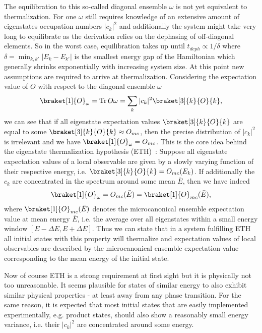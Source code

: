 The equilibration to this so-called diagonal ensemble $\omega$ is not yet equivalent to thermalization. For one $\omega$ still requires knowledge of an extensive amount of eigenstates occupation numbers  $|c_k|^2$ and additionally the system might take very long to equilibrate as the derivation relies on the dephasing of off-diagonal elements. So in the worst case, equilibration takes up until $t_{deph} \propto 1/\delta$ where $\delta=\min_{k,k'}|E_k-E_{k'}|$ is the smallest energy gap of the Hamiltonian which generally shrinks exponentially with increasing system size. At this point new assumptions are required to arrive at thermalization. Considering the expectation value of $O$ with respect to the diagonal ensemble $\omega$
\begin{equation}
	\braket[1]{O}_{\omega} = \Tr O \omega = \sum_k |c_k|^2 \braket[3]{k}{O}{k},
\end{equation}
we can see that if all eigenstate expectation values $\braket[3]{k}{O}{k}$ are equal to some $\braket[3]{k}{O}{k}\approx O_{mc}$, then the precise distribution of $|c_k|^2$ is irrelevant and we have $\braket[1]{O}_{\omega} = O_{mc}$. 
This is the core idea behind the eigenstate thermalization hypothesis (ETH)~\cite{deutschQuantumStatisticalMechanics1991,srednickiChaosQuantumThermalization1994,rigolThermalizationItsMechanism2008}: Suppose all eigenstate expectation values of a local observable are given by a slowly varying function of their respective energy, i.e. $\braket[3]{k}{O}{k}=O_{mc}(E_k)$. 
If additionally the $c_k$ are concentrated in the spectrum around some mean $\bar{E}$, then we have indeed
\begin{align}
	\braket[1]{O}_{\omega} = O_{mc}(\bar{E}) = \braket[1]{O}_{mc}(\bar{E}),
\end{align}
where $\braket[1]{O}_{mc}(\bar{E})$ denotes the microcanonical ensemble expectation value at mean energy $\bar{E}$, i.e. the average over all eigenstates within a small energy window $[E-\Delta E, E+\Delta E]$. Thus we can state that in a system fulfilling ETH all initial states with this property will thermalize and expectation values of local observables are described by the microcanonical ensemble expectation value corresponding to the mean energy of the initial state.

Now of course ETH is a strong requirement at first sight but it is physically not too unreasonable. It seems plausible for states of similar energy to also exhibit similar physical properties - at least away from any phase transition. For the same reason, it is expected that most initial states that are easily implemented experimentally, e.g. product states, should also show a reasonably small energy variance, i.e. their $|c_k|^2$ are concentrated around some energy.

